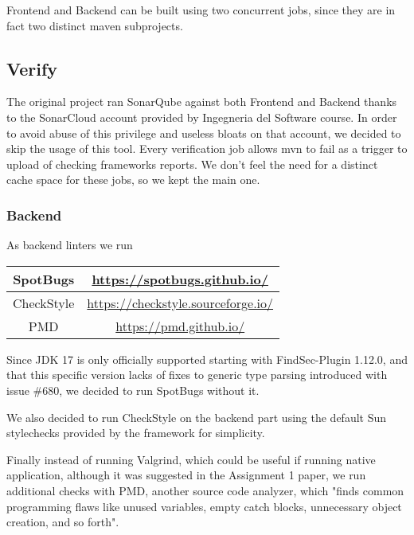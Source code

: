 \documentclass[a4paper,10pt]{scrartcl}
\begin{document}
Frontend and Backend can be built using two concurrent jobs, since they are in fact two distinct maven subprojects.

\subsection{Verify}

The original project ran SonarQube against both Frontend and Backend thanks to the SonarCloud account provided by Ingegneria del Software course. In order to avoid abuse of this privilege and useless bloats on that account, we decided to skip the usage of this tool.
Every verification job allows mvn to fail as a trigger to upload of checking frameworks reports. We don't feel the need for a distinct cache space for these jobs, so we kept the main one.

\subsubsection{Backend}
 
As backend linters we run

\begin{center}
    \begin{tabular}{|c|c|}
        \hline
        SpotBugs & \href{https://spotbugs.github.io/}{https://spotbugs.github.io/} \\
        \hline
        CheckStyle & \href{https://checkstyle.sourceforge.io/}{https://checkstyle.sourceforge.io/} \\
        \hline
        PMD & \href{https://pmd.github.io/}{https://pmd.github.io/} \\
        \hline
    \end{tabular}
\end{center}

Since JDK 17 is only officially supported starting with FindSec-Plugin 1.12.0, and that this specific version lacks of fixes to generic type parsing introduced with issue \#680, we decided to run SpotBugs without it.

We also decided to run CheckStyle on the backend part using the default Sun stylechecks provided by the framework for simplicity.

Finally instead of running Valgrind, which could be useful if running native application, although it was suggested in the Assignment 1 paper, we run additional checks with PMD, another source code analyzer, which "finds common programming flaws like unused variables, empty catch blocks, unnecessary object creation, and so forth".
\end{document}

